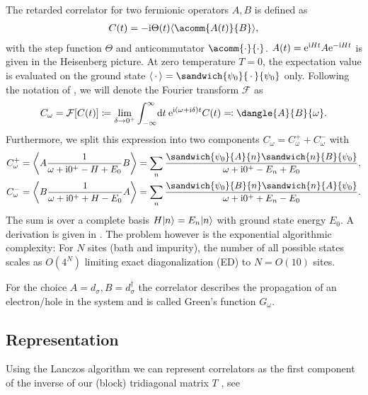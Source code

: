 The retarded correlator for two fermionic operators $A, B$ is defined as
\begin{align}
    C(t) = -\mi \Theta(t) \expval{\acomm{A(t)}{B}},
\end{align}
with the step function $\Theta$ and anticommutator $\acomm{\cdot}{\cdot}$.
$A(t) = \mathrm{e}^{\mathrm{i} H t} A \mathrm{e}^{-\mathrm{i} H t}$ is given in the Heisenberg picture.
At zero temperature $T=0$, the expectation value is evaluated on the ground state
$\expval{\,\cdot\,} = \sandwich{\psi_0}{\,\cdot\,}{\psi_0}$ only.
Following the notation of \cite{Bulla1998,Kugler2022},
we will denote the Fourier transform $\mathcal{F}$ as
\begin{equation}
    C_\omega
    =
    \mathcal{F}[C(t)]
    \coloneq
    \lim_{\delta\to0^+}
    \int_{-\infty}^\infty\! \md t\> \me^{\mi (\omega + \mi\delta) t} C(t)
    \eqcolon
    \dangle{A}{B}{\omega}.
\end{equation}
Furthermore,
we split this expression into two components $C_\omega = C^+_\omega + C^-_\omega$ with
\begin{subequations}
    \begin{align}
        C^+_\omega
         & =
        \expval*{A \frac{1}{\omega + \mi0^+ - H + E_0} B}
        =
        \sum_n \frac{\sandwich{\psi_0}{A}{n}\sandwich{n}{B}{\psi_0}}{\omega + \mi0^+ - E_n + E_0}, \\
        C^-_\omega
         & =
        \expval*{B \frac{1}{\omega + \mi0^+ + H - E_0} A}
        =
        \sum_n \frac{\sandwich{\psi_0}{B}{n}\sandwich{n}{A}{\psi_0}}{\omega + \mi0^+ + E_n - E_0}.
    \end{align}
\end{subequations}
The sum is over a complete basis $H\lvert n\rangle = E_n\lvert n\rangle$ with ground state energy $E_0$.
A derivation is given in .
The problem however is the exponential algorithmic complexity:
For $N$ sites (bath and impurity), the number of all possible states scales as $O(4^N)$
limiting exact diagonalization (ED) to $N=O(10)$ sites.

For the choice $A=d_\sigma, B=d_\sigma^\dag$ the correlator describes
the propagation of an electron/hole in the system and is called Green's function $G_\omega$.

\subsection{Representation}

Using the Lanczos algorithm we can represent correlators as the first component of the inverse
of our (block) tridiagonal matrix $T$ \cite{Lu2014}, see 

